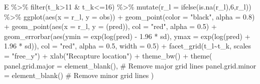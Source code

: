 \documentclass[
  letterpaper,
  DIV=11,
  numbers=noendperiod]{scrartcl}
\newenvironment{Shaded}{\begin{snugshade}}{\end{snugshade}}
\newcommand{\AttributeTok}[1]{\textcolor[rgb]{0.40,0.45,0.13}{#1}}
\newcommand{\CommentTok}[1]{\textcolor[rgb]{0.37,0.37,0.37}{#1}}
\newcommand{\DecValTok}[1]{\textcolor[rgb]{0.68,0.00,0.00}{#1}}
\newcommand{\FloatTok}[1]{\textcolor[rgb]{0.68,0.00,0.00}{#1}}
\newcommand{\FunctionTok}[1]{\textcolor[rgb]{0.28,0.35,0.67}{#1}}
\newcommand{\NormalTok}[1]{\textcolor[rgb]{0.00,0.23,0.31}{#1}}
\newcommand{\SpecialCharTok}[1]{\textcolor[rgb]{0.37,0.37,0.37}{#1}}
\newcommand{\StringTok}[1]{\textcolor[rgb]{0.13,0.47,0.30}{#1}}
\begin{document}
\begin{Shaded}
\begin{Highlighting}[]
\NormalTok{E }\SpecialCharTok{\%\textgreater{}\%}
  \FunctionTok{filter}\NormalTok{(t\_k}\SpecialCharTok{\textgreater{}}\DecValTok{11} \SpecialCharTok{\&}\NormalTok{ t\_k}\SpecialCharTok{\textless{}=}\DecValTok{16}\NormalTok{) }\SpecialCharTok{\%\textgreater{}\%}
  \FunctionTok{mutate}\NormalTok{(}\AttributeTok{r\_l =} \FunctionTok{ifelse}\NormalTok{(}\FunctionTok{is.na}\NormalTok{(r\_l),}\DecValTok{6}\NormalTok{,r\_l)) }\SpecialCharTok{\%\textgreater{}\%}
  \FunctionTok{ggplot}\NormalTok{(}\FunctionTok{aes}\NormalTok{(}\AttributeTok{x =}\NormalTok{ r\_l, }\AttributeTok{y =}\NormalTok{ obs)) }\SpecialCharTok{+}
  \FunctionTok{geom\_point}\NormalTok{(}\AttributeTok{color =} \StringTok{"black"}\NormalTok{, }\AttributeTok{alpha =} \FloatTok{0.8}\NormalTok{) }\SpecialCharTok{+}
  \FunctionTok{geom\_point}\NormalTok{(}\FunctionTok{aes}\NormalTok{(}\AttributeTok{x =}\NormalTok{ r\_l, }\AttributeTok{y =}\NormalTok{ (pred)), }\AttributeTok{col =} \StringTok{"red"}\NormalTok{, }\AttributeTok{alpha =} \FloatTok{0.5}\NormalTok{) }\SpecialCharTok{+}
  \FunctionTok{geom\_errorbar}\NormalTok{(}\FunctionTok{aes}\NormalTok{(}\AttributeTok{ymin =} \FunctionTok{exp}\NormalTok{(}\FunctionTok{log}\NormalTok{(pred) }\SpecialCharTok{{-}} \FloatTok{1.96} \SpecialCharTok{*}\NormalTok{ sd), }\AttributeTok{ymax =} \FunctionTok{exp}\NormalTok{(}\FunctionTok{log}\NormalTok{(pred) }\SpecialCharTok{+} \FloatTok{1.96} \SpecialCharTok{*}\NormalTok{ sd)), }\AttributeTok{col =} \StringTok{"red"}\NormalTok{, }\AttributeTok{alpha =} \FloatTok{0.5}\NormalTok{, }\AttributeTok{width =} \FloatTok{0.5}\NormalTok{) }\SpecialCharTok{+}
\FunctionTok{facet\_grid}\NormalTok{(t\_l}\SpecialCharTok{\textasciitilde{}}\NormalTok{t\_k, }\AttributeTok{scales =} \StringTok{"free\_y"}\NormalTok{) }\SpecialCharTok{+}
    \FunctionTok{xlab}\NormalTok{(}\StringTok{"Recapture location"}\NormalTok{) }\SpecialCharTok{+}
  \FunctionTok{theme\_bw}\NormalTok{() }\SpecialCharTok{+}
  \FunctionTok{theme}\NormalTok{(}
    \AttributeTok{panel.grid.major =} \FunctionTok{element\_blank}\NormalTok{(),  }\CommentTok{\# Remove major grid lines}
    \AttributeTok{panel.grid.minor =} \FunctionTok{element\_blank}\NormalTok{()   }\CommentTok{\# Remove minor grid lines}
\NormalTok{  )}
\end{Highlighting}
\end{Shaded}
\end{document}
